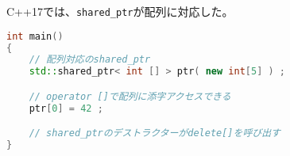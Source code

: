 %

C++17では、\lstinline!shared_ptr!が配列に対応した。

\begin{lstlisting}[language=C++]
int main()
{
    // 配列対応のshared_ptr
    std::shared_ptr< int [] > ptr( new int[5] ) ;

    // operator []で配列に添字アクセスできる
    ptr[0] = 42 ;

    // shared_ptrのデストラクターがdelete[]を呼び出す
}
\end{lstlisting}

